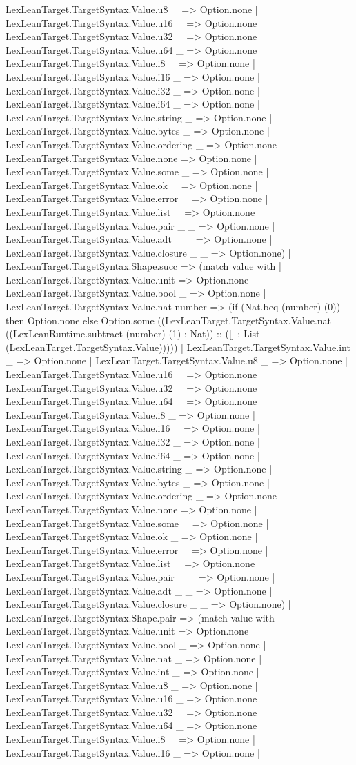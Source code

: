 \documentclass[11pt]{article}
\begin{document}
LexLeanTarget.TargetSyntax.Value.u8 \_ => Option.none | LexLeanTarget.TargetSyntax.Value.u16 \_ => Option.none | LexLeanTarget.TargetSyntax.Value.u32 \_ => Option.none | LexLeanTarget.TargetSyntax.Value.u64 \_ => Option.none | LexLeanTarget.TargetSyntax.Value.i8 \_ => Option.none | LexLeanTarget.TargetSyntax.Value.i16 \_ => Option.none | LexLeanTarget.TargetSyntax.Value.i32 \_ => Option.none | LexLeanTarget.TargetSyntax.Value.i64 \_ => Option.none | LexLeanTarget.TargetSyntax.Value.string \_ => Option.none | LexLeanTarget.TargetSyntax.Value.bytes \_ => Option.none | LexLeanTarget.TargetSyntax.Value.ordering \_ => Option.none | LexLeanTarget.TargetSyntax.Value.none => Option.none | LexLeanTarget.TargetSyntax.Value.some \_ => Option.none | LexLeanTarget.TargetSyntax.Value.ok \_ => Option.none | LexLeanTarget.TargetSyntax.Value.error \_ => Option.none | LexLeanTarget.TargetSyntax.Value.list \_ => Option.none | LexLeanTarget.TargetSyntax.Value.pair \_ \_ => Option.none | LexLeanTarget.TargetSyntax.Value.adt \_ \_ => Option.none | LexLeanTarget.TargetSyntax.Value.closure \_ \_ => Option.none) | LexLeanTarget.TargetSyntax.Shape.succ => (match value with | LexLeanTarget.TargetSyntax.Value.unit => Option.none | LexLeanTarget.TargetSyntax.Value.bool \_ => Option.none | LexLeanTarget.TargetSyntax.Value.nat number => (if (Nat.beq (number) (0)) then Option.none else Option.some ((LexLeanTarget.TargetSyntax.Value.nat ((LexLeanRuntime.subtract (number) (1) : Nat)) :: ([] : List (LexLeanTarget.TargetSyntax.Value))))) | LexLeanTarget.TargetSyntax.Value.int \_ => Option.none | LexLeanTarget.TargetSyntax.Value.u8 \_ => Option.none | LexLeanTarget.TargetSyntax.Value.u16 \_ => Option.none | LexLeanTarget.TargetSyntax.Value.u32 \_ => Option.none | LexLeanTarget.TargetSyntax.Value.u64 \_ => Option.none | LexLeanTarget.TargetSyntax.Value.i8 \_ => Option.none | LexLeanTarget.TargetSyntax.Value.i16 \_ => Option.none | LexLeanTarget.TargetSyntax.Value.i32 \_ => Option.none | LexLeanTarget.TargetSyntax.Value.i64 \_ => Option.none | LexLeanTarget.TargetSyntax.Value.string \_ => Option.none | LexLeanTarget.TargetSyntax.Value.bytes \_ => Option.none | LexLeanTarget.TargetSyntax.Value.ordering \_ => Option.none | LexLeanTarget.TargetSyntax.Value.none => Option.none | LexLeanTarget.TargetSyntax.Value.some \_ => Option.none | LexLeanTarget.TargetSyntax.Value.ok \_ => Option.none | LexLeanTarget.TargetSyntax.Value.error \_ => Option.none | LexLeanTarget.TargetSyntax.Value.list \_ => Option.none | LexLeanTarget.TargetSyntax.Value.pair \_ \_ => Option.none | LexLeanTarget.TargetSyntax.Value.adt \_ \_ => Option.none | LexLeanTarget.TargetSyntax.Value.closure \_ \_ => Option.none) | LexLeanTarget.TargetSyntax.Shape.pair => (match value with | LexLeanTarget.TargetSyntax.Value.unit => Option.none | LexLeanTarget.TargetSyntax.Value.bool \_ => Option.none | LexLeanTarget.TargetSyntax.Value.nat \_ => Option.none | LexLeanTarget.TargetSyntax.Value.int \_ => Option.none | LexLeanTarget.TargetSyntax.Value.u8 \_ => Option.none | LexLeanTarget.TargetSyntax.Value.u16 \_ => Option.none | LexLeanTarget.TargetSyntax.Value.u32 \_ => Option.none | LexLeanTarget.TargetSyntax.Value.u64 \_ => Option.none | LexLeanTarget.TargetSyntax.Value.i8 \_ => Option.none | LexLeanTarget.TargetSyntax.Value.i16 \_ => Option.none | 
\end{document}
